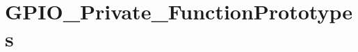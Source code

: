 \hypertarget{group___g_p_i_o___private___function_prototypes}{}\section{G\+P\+I\+O\+\_\+\+Private\+\_\+\+Function\+Prototypes}
\label{group___g_p_i_o___private___function_prototypes}
